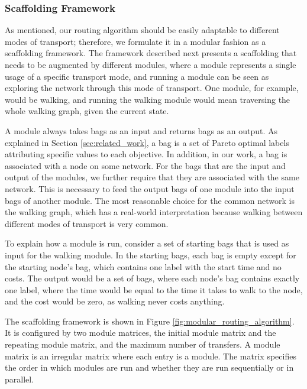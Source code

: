 \subsubsection{Scaffolding Framework}
\label{subsubsec:algorithm}

As mentioned, our routing algorithm should be easily adaptable to different modes of transport; therefore, we formulate it in a modular fashion as a scaffolding framework.
The framework described next presents a scaffolding that needs to be augmented by different modules, where a module represents a single usage of a specific transport mode, and running a module can be seen as exploring the network through this mode of transport.
One module, for example, would be walking, and running the walking module would mean traversing the whole walking graph, given the current state.

A module always takes bags as an input and returns bags as an output.
As explained in Section \ref{sec:related_work}, a bag is a set of Pareto optimal labels attributing specific values to each objective.
In addition, in our work, a bag is associated with a node on some network.
For the bags that are the input and output of the modules, we further require that they are associated with the same network.
This is necessary to feed the output bags of one module into the input bags of another module.
The most reasonable choice for the common network is the walking graph, which has a real-world interpretation because walking between different modes of transport is very common.

To explain how a module is run, consider a set of starting bags that is used as input for the walking module.
In the starting bags, each bag is empty except for the starting node's bag, which contains one label with the start time and no costs.
The output would be a set of bags, where each node's bag contains exactly one label, where the time would be equal to the time it takes to walk to the node, and the cost would be zero, as walking never costs anything.

The scaffolding framework is shown in Figure \ref{fig:modular_routing_algorithm}.
It is configured by two module matrices, the initial module matrix and the repeating module matrix, and the maximum number of transfers.
A module matrix is an irregular matrix where each entry is a module.
The matrix specifies the order in which modules are run and whether they are run sequentially or in parallel.

